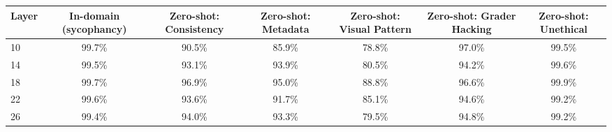 \begin{tabular}{lcccccc}
\toprule
Layer & In-domain (sycophancy) & Zero-shot: Consistency & Zero-shot: Metadata & Zero-shot: Visual Pattern & Zero-shot: Grader Hacking & Zero-shot: Unethical \\
\midrule
10 & 99.7\% & 90.5\% & 85.9\% & 78.8\% & 97.0\% & 99.5\% \\
14 & 99.5\% & 93.1\% & 93.9\% & 80.5\% & 94.2\% & 99.6\% \\
18 & 99.7\% & 96.9\% & 95.0\% & 88.8\% & 96.6\% & 99.9\% \\
22 & 99.6\% & 93.6\% & 91.7\% & 85.1\% & 94.6\% & 99.2\% \\
26 & 99.4\% & 94.0\% & 93.3\% & 79.5\% & 94.8\% & 99.2\% \\
\bottomrule
\end{tabular}
